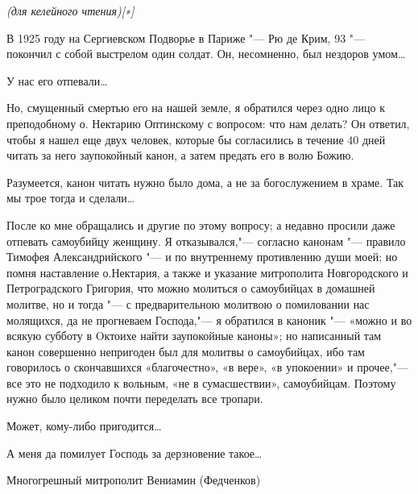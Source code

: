 \mychapterending


 

\itshape  (для келейного
чтения)[∗]\normalfont{}



   В 1925 году на Сергиевском Подворье в Париже "--- Рю де Крим, 93 "---
покончил с собой выстрелом один солдат. Он, несомненно, был нездоров
умом…



   У нас его отпевали…



   Но, смущенный смертью его на нашей земле, я обратился через одно лицо
к преподобному о. Нектарию Оптинскому с вопросом: что нам делать? Он
ответил, чтобы я нашел еще двух человек, которые бы согласились в течение
40 дней читать за него заупокойный канон, а затем предать его в волю
Божию.



   Разумеется, канон читать нужно было дома, а не за богослужением в
храме. Так мы трое тогда и сделали…



   После ко мне обращались и другие по этому вопросу; а недавно
просили даже отпевать самоубийцу женщину. Я отказывался,"--- согласно
канонам "--- правило Тимофея Александрийского "--- и по внутреннему
противлению души моей; но помня наставление о.Нектария, а также и
указание митрополита Новгородского и Петроградского Григория, что
можно молиться о самоубийцах в домашней молитве, но и тогда "--- с
предварительною молитвою о помиловании нас молящихся, да не
прогневаем Господа,"--- я обратился в каноник "--- «можно и во всякую субботу
в Oктоихе найти заупокойные каноны»; но написанный там канон
совершенно непригоден был для молитвы о самоубийцах, ибо там
говорилось о скончавшихся «благочестно», «в вере», «в упокоении»
и прочее,"--- все это не подходило к вольным, «не в сумасшествии»,
самоубийцам. Поэтому нужно было целиком почти переделать все
тропари.



   Может, кому-либо пригодится…



   А меня да помилует Господь за дерзновение такое…



   Многогрешный митрополит Вениамин (Федченков)
   


 

